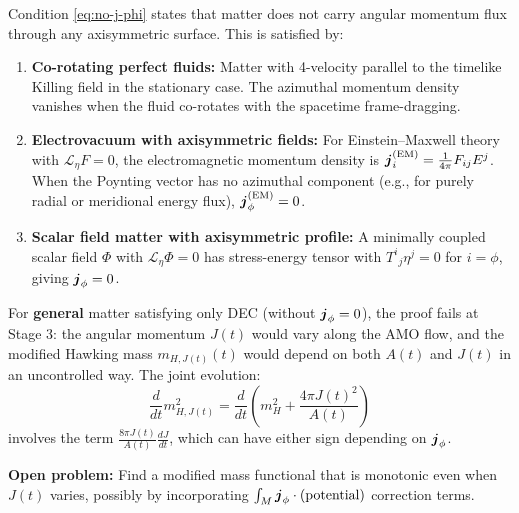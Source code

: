 \begin{remark}\label{rem:h3prime-physics}
Condition \eqref{eq:no-j-phi} states that matter does not carry angular momentum flux through any axisymmetric surface. This is satisfied by:
\begin{enumerate}
    \item \textbf{Co-rotating perfect fluids:} Matter with 4-velocity parallel to the timelike Killing field in the stationary case. The azimuthal momentum density vanishes when the fluid co-rotates with the spacetime frame-dragging.
    
    \item \textbf{Electrovacuum with axisymmetric fields:} For Einstein--Maxwell theory with $\mathcal{L}_\eta F = 0$, the electromagnetic momentum density is $\boldsymbol{j}^{(\mathrm{EM})}_i = \frac{1}{4\pi}F_{ij}E^j$. When the Poynting vector has no azimuthal component (e.g., for purely radial or meridional energy flux), $\boldsymbol{j}^{(\mathrm{EM})}_\phi = 0$.
    
    \item \textbf{Scalar field matter with axisymmetric profile:} A minimally coupled scalar field $\Phi$ with $\mathcal{L}_\eta \Phi = 0$ has stress-energy tensor with $T^i{}_j\eta^j = 0$ for $i = \phi$, giving $\boldsymbol{j}_\phi = 0$.
\end{enumerate}
\end{remark}

\begin{remark}\label{rem:full-nonvacuum}
For \textbf{general} matter satisfying only DEC (without $\boldsymbol{j}_\phi = 0$), the proof fails at Stage 3: the angular momentum $J(t)$ would vary along the AMO flow, and the modified Hawking mass $m_{H,J(t)}(t)$ would depend on both $A(t)$ and $J(t)$ in an uncontrolled way. The joint evolution:
\[
\frac{d}{dt}m_{H,J(t)}^2 = \frac{d}{dt}\left(m_H^2 + \frac{4\pi J(t)^2}{A(t)}\right)
\]
involves the term $\frac{8\pi J(t)}{A(t)}\frac{dJ}{dt}$, which can have either sign depending on $\boldsymbol{j}_\phi$.

\textbf{Open problem:} Find a modified mass functional that is monotonic even when $J(t)$ varies, possibly by incorporating $\int_M \boldsymbol{j}_\phi \cdot (\text{potential})$ correction terms.
\end{remark}

